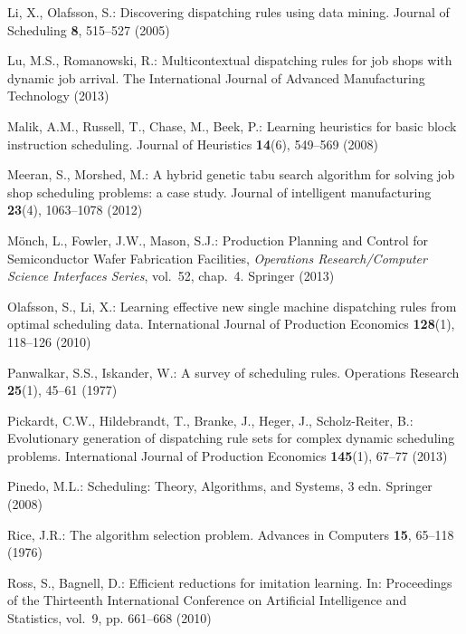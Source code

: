 \documentclass[twocolumn]{svjour3}
\begin{document}
\begin{thebibliography}{10}
    Li, X., Olafsson, S.: Discovering dispatching rules using data mining.
    \newblock Journal of Scheduling \textbf{8}, 515--527 (2005)
    
    Lu, M.S., Romanowski, R.: {Multicontextual dispatching rules for job shops 
    with
        dynamic job arrival}.
    \newblock The International Journal of Advanced Manufacturing Technology
    (2013)
    
    Malik, A.M., Russell, T., Chase, M., Beek, P.: Learning heuristics for basic
    block instruction scheduling.
    \newblock Journal of Heuristics \textbf{14}(6), 549--569 (2008)
    
    Meeran, S., Morshed, M.: A hybrid genetic tabu search algorithm for solving 
    job
    shop scheduling problems: a case study.
    \newblock Journal of intelligent manufacturing \textbf{23}(4), 1063--1078
    (2012)
    
    M\"{o}nch, L., Fowler, J.W., Mason, S.J.: {Production Planning and Control 
    for
        Semiconductor Wafer Fabrication Facilities}, \emph{Operations
        Research/Computer Science Interfaces Series}, vol.~52, chap.~4.
    \newblock Springer (2013)
    
    Olafsson, S., Li, X.: Learning effective new single machine dispatching 
    rules
    from optimal scheduling data.
    \newblock International Journal of Production Economics \textbf{128}(1),
    118--126 (2010)
    
    Panwalkar, S.S., Iskander, W.: A survey of scheduling rules.
    \newblock Operations Research \textbf{25}(1), 45--61 (1977)
    
    Pickardt, C.W., Hildebrandt, T., Branke, J., Heger, J., Scholz-Reiter, B.:
    {Evolutionary generation of dispatching rule sets for complex dynamic
        scheduling problems}.
    \newblock International Journal of Production Economics \textbf{145}(1), 
    67--77
    (2013)
    
    Pinedo, M.L.: Scheduling: Theory, Algorithms, and Systems, 3 edn.
    \newblock Springer (2008)
    
    Rice, J.R.: The algorithm selection problem.
    \newblock Advances in Computers \textbf{15}, 65--118 (1976)
    
    Ross, S., Bagnell, D.: Efficient reductions for imitation learning.
    \newblock In: Proceedings of the Thirteenth International Conference on
    Artificial Intelligence and Statistics, vol.~9, pp. 661--668 (2010)
    

\end{thebibliography}
\end{document}

